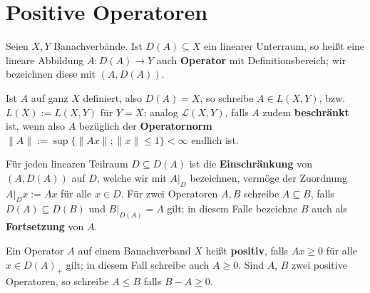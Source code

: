 

\section{Positive Operatoren}

\par
Seien $X, Y$ Banachverbände. Ist $D(A)\subseteq X$ ein linearer Unterraum, so heißt eine lineare Abbildung $A\colon D(A)\to Y$ auch \textbf{Operator} mit Definitionsbereich; wir bezeichnen diese mit $(A, D(A))$. 


Ist $A$ auf ganz $X$ definiert, also $D(A)=X$, so schreibe $A\in L(X, Y)$, bzw. $L(X):= L(X,Y)$ für $Y=X$; analog $\mathcal L(X,Y)$, falls $A$ zudem \textbf{beschränkt} ist, wenn also $A$ bezüglich der \textbf{Operatornorm} $ \|A\|:=\sup\big\{\|Ax\|;\|x\|\leq 1\big\}<\infty $ endlich ist. 

\par
Für jeden linearen Teilraum $D\subseteq D(A)$ ist die \textbf{Einschränkung} von $(A, D(A))$ auf $D$, welche wir mit $A|_D$ bezeichnen, vermöge der Zuordnung $A|_D x:= Ax$ für alle $x\in D$. Für zwei Operatoren $A,B$ schreibe $A\subseteq B$, falls $D(A)\subseteq D(B)$  und $B|_{D(A)}=A$ gilt; in diesem Falle bezeichne $B$ auch als \textbf{Fortsetzung} von $A$. 

\par
Ein Operator $A$ auf einem Banachverband $X$ heißt \textbf{positiv}, falls $Ax\geq0$ für alle $x\in D(A)_+$ gilt; in diesem Fall schreibe auch $A\geq0$. Sind $A$, $B$ zwei positive Operatoren, so schreibe $A\leq B$ falls $B-A\geq0$. 



